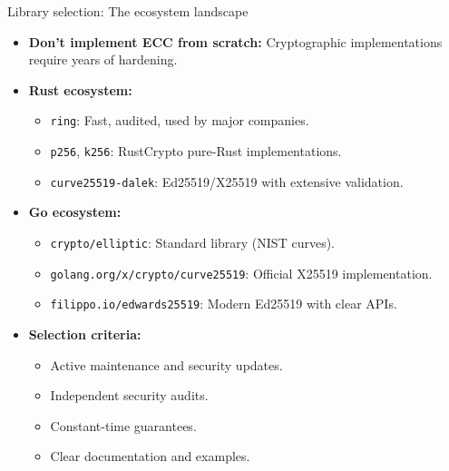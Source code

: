 \documentclass[aspectratio=169, lualatex, handout]{beamer}
\begin{document}
\begin{frame}{Library selection: The ecosystem landscape}
	\begin{itemize}
		\item \textbf{Don't implement ECC from scratch:} Cryptographic implementations require years of hardening.
		\item \textbf{Rust ecosystem:}
		      \begin{itemize}
			      \item \texttt{ring}: Fast, audited, used by major companies.
			      \item \texttt{p256}, \texttt{k256}: RustCrypto pure-Rust implementations.
			      \item \texttt{curve25519-dalek}: Ed25519/X25519 with extensive validation.
		      \end{itemize}
		\item \textbf{Go ecosystem:}
		      \begin{itemize}
			      \item \texttt{crypto/elliptic}: Standard library (NIST curves).
			      \item \texttt{golang.org/x/crypto/curve25519}: Official X25519 implementation.
			      \item \texttt{filippo.io/edwards25519}: Modern Ed25519 with clear APIs.
		      \end{itemize}
		\item \textbf{Selection criteria:}
		      \begin{itemize}
			      \item Active maintenance and security updates.
			      \item Independent security audits.
			      \item Constant-time guarantees.
			      \item Clear documentation and examples.
		      \end{itemize}
	\end{itemize}
\end{frame}
\end{document}

